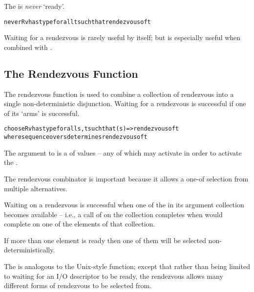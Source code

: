 The   is \emph{never} `ready'.

\begin{alltt}
neverRv has type for all t such that rendezvous of t
\end{alltt}

\begin{aside}
Waiting for a  rendezvous is rarely useful by itself; but is especially useful when combined with .
\end{aside}

\subsection{The  Rendezvous Function}
\label{chooseRvFun}

The  rendezvous function is used to combine a collection of rendezvous into a single non-deterministic disjunction. Waiting for a  rendezvous is successful if one of its `arms' is successful.

\begin{alltt}
chooseRv has type for all s,t such that (s)=>rendezvous of t
                  where sequence over s determines rendezvous of t
\end{alltt}

The argument to  is a  of  values -- any of which may activate in order to activate the .

The  rendezvous combinator is important because it allows a one-of selection from multiple alternatives. 

\begin{aside}
Waiting on a  rendezvous is successful when one of the  in its argument collection becomes available -- i.e., a call of  on the  collection completes when  would complete on one of the elements of that collection.

If more than one element  is ready then one of them will be selected non-deterministically. 
\end{aside}

\begin{aside}
The   is analogous to the Unix-style  function; except that rather than being limited to waiting for an I/O descriptor to be ready, the  rendezvous allows many different forms of rendezvous to be selected from.
\end{aside}

